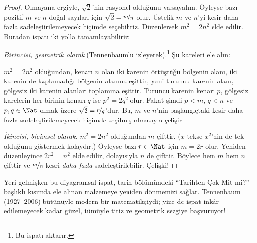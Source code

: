 \documentclass[../../../include/open-logic-section]{subfiles}
\begin{document}
\begin{proof}
Olmayana ergiyle, $\sqrt{2}$'nin rasyonel olduğunu varsayalım. Öyleyse bazı
pozitif $m$ ve $n$ doğal sayıları için $\sqrt{2} = \nicefrac{m}{n}$ olur.
Üstelik $m$ ve $n$'yi kesir daha fazla sadeleştirilemeyecek biçimde
seçebiliriz.
Düzenlersek $m^{2} = 2n^{2}$ elde edilir. Buradan ispatı iki yolla
tamamlayabiliriz:

\emph{Birincisi, geometrik olarak} (Tennenbaum'u izleyerek).\footnote{Bu ispatı
\cite{Conway2006} aktarır.} Şu kareleri ele alın:
\begin{center}	
\end{center}
$m^2 = 2n^2$ olduğundan, kenarı $n$ olan iki karenin örtüştüğü bölgenin
alanı, iki karenin de kaplamadığı bölgenin alanına eşittir; yani turuncu
karenin alanı, gölgesiz iki karenin alanları toplamına eşittir. Turuncu
karenin kenarı $p$, gölgesiz karelerin her birinin kenarı $q$ ise
$p^2 = 2q^2$ olur. Fakat şimdi $p < m$, $q < n$ ve $p, q \in \Nat$ olmak
üzere $\sqrt{2} = \nicefrac{p}{q}$'dur. Bu, $m$ ve $n$'nin başlangıçtaki
kesir daha fazla sadeleştirilemeyecek biçimde seçilmiş olmasıyla çelişir.
		
\emph{İkincisi, biçimsel olarak.} $m^{2} = 2n^{2}$ olduğundan $m$ çifttir.
($x$ tekse $x^2$'nin de tek olduğunu göstermek kolaydır.) Öyleyse bazı
$r \in \Nat$ için $m = 2r$ olur. Yeniden düzenleyince $2r^2 = n^2$ elde
edilir,
dolayısıyla $n$ de çifttir. Böylece hem $m$ hem $n$ çifttir ve
$\nicefrac{m}{n}$ kesri \emph{daha fazla} sadeleştirilebilir. Çelişki!
\end{proof}

Yeri gelmişken bu diyagramsal ispat, tarih bölümündeki “Tarihten Çok Mit mi?”
başlıklı kısımda ele alınan malzemeye yeniden dönmemizi sağlar. Tennenbaum
(1927--2006) bütünüyle modern
bir matematikçiydi; yine de ispat inkâr edilemeyecek kadar güzel, tümüyle
titiz ve geometrik sezgiye başvuruyor!
\end{document}
